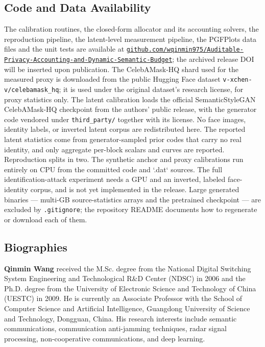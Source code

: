 \documentclass[10pt,twocolumn,letterpaper]{article}
\theoremstyle{plain}
\theoremstyle{definition}
\begin{document}
\subsection*{Code and Data Availability}
The calibration routines, the closed-form allocator and its accounting solvers, the
reproduction pipeline, the latent-level measurement pipeline, the PGFPlots data files
and the unit tests are available at
\href{https://github.com/wqinmin975/Auditable-Privacy-Accounting-and-Dynamic-Semantic-Budget}{\texttt{github.com/wqinmin975/\allowbreak Auditable-\allowbreak Privacy-\allowbreak Accounting-\allowbreak and-\allowbreak Dynamic-\allowbreak Semantic-\allowbreak Budget}};
the archived release DOI will be inserted upon publication. The CelebAMask-HQ shard used
for the measured proxy is downloaded from the public Hugging Face dataset \texttt{v-xchen-v/celebamask\_hq}; it is
used under the original dataset's research license, for proxy statistics only. The
latent calibration loads the official SemanticStyleGAN CelebAMask-HQ checkpoint from the
authors' public release, with the generator code vendored under \texttt{third\_party/} together with its
license. No face images, identity labels, or inverted latent corpus are redistributed
here. The reported latent statistics come from generator-sampled prior codes that carry
no real identity, and only aggregate per-block scalars and curves are reported.
Reproduction splits in two. The synthetic anchor and proxy calibrations run entirely on
CPU from the committed code and `.dat` sources. The full identification-attack
experiment needs a GPU and an inverted, labeled face-identity corpus, and is not yet
implemented in the release. Large generated binaries --- multi-GB source-statistics
arrays and the pretrained checkpoint --- are excluded by \texttt{.gitignore}; the repository README
documents how to regenerate or download each of them.

\subsection*{Biographies}

\textbf{Qinmin Wang} received the M.Sc. degree from the National Digital
Switching System Engineering and Technological R\&D Center (NDSC) in 2006 and
the Ph.D. degree from the University of Electronic Science and Technology of
China (UESTC) in 2009. He is currently an Associate Professor with the School
of Computer Science and Artificial Intelligence, Guangdong University of
Science and Technology, Dongguan, China. His research interests include
semantic communications, communication anti-jamming techniques, radar signal
processing, non-cooperative communications, and deep learning.
\end{document}
